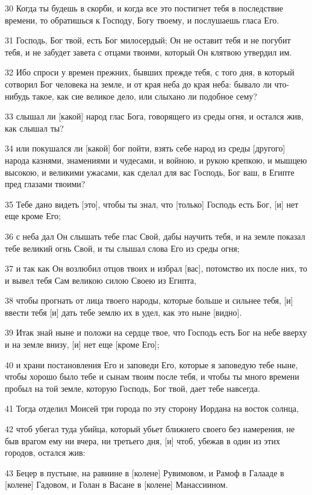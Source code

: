 \par 30 Когда ты будешь в скорби, и когда все это постигнет тебя в последствие времени, то обратишься к Господу, Богу твоему, и послушаешь гласа Его.
\par 31 Господь, Бог твой, есть Бог милосердый; Он не оставит тебя и не погубит тебя, и не забудет завета с отцами твоими, который Он клятвою утвердил им.
\par 32 Ибо спроси у времен прежних, бывших прежде тебя, с того дня, в который сотворил Бог человека на земле, и от края неба до края неба: бывало ли что-нибудь такое, как сие великое дело, или слыхано ли подобное сему?
\par 33 слышал ли [какой] народ глас Бога, говорящего из среды огня, и остался жив, как слышал ты?
\par 34 или покушался ли [какой] бог пойти, взять себе народ из среды [другого] народа казнями, знамениями и чудесами, и войною, и рукою крепкою, и мышцею высокою, и великими ужасами, как сделал для вас Господь, Бог ваш, в Египте пред глазами твоими?
\par 35 Тебе дано видеть [это], чтобы ты знал, что [только] Господь есть Бог, [и] нет еще кроме Его;
\par 36 с неба дал Он слышать тебе глас Свой, дабы научить тебя, и на земле показал тебе великий огнь Свой, и ты слышал слова Его из среды огня;
\par 37 и так как Он возлюбил отцов твоих и избрал [вас], потомство их после них, то и вывел тебя Сам великою силою Своею из Египта,
\par 38 чтобы прогнать от лица твоего народы, которые больше и сильнее тебя, [и] ввести тебя [и] дать тебе землю их в удел, как это ныне [видно].
\par 39 Итак знай ныне и положи на сердце твое, что Господь есть Бог на небе вверху и на земле внизу, [и] нет еще [кроме Его];
\par 40 и храни постановления Его и заповеди Его, которые я заповедую тебе ныне, чтобы хорошо было тебе и сынам твоим после тебя, и чтобы ты много времени пробыл на той земле, которую Господь, Бог твой, дает тебе навсегда.
\par 41 Тогда отделил Моисей три города по эту сторону Иордана на восток солнца,
\par 42 чтоб убегал туда убийца, который убьет ближнего своего без намерения, не быв врагом ему ни вчера, ни третьего дня, [и] чтоб, убежав в один из этих городов, остался жив:
\par 43 Бецер в пустыне, на равнине в [колене] Рувимовом, и Рамоф в Галааде в [колене] Гадовом, и Голан в Васане в [колене] Манассиином.

